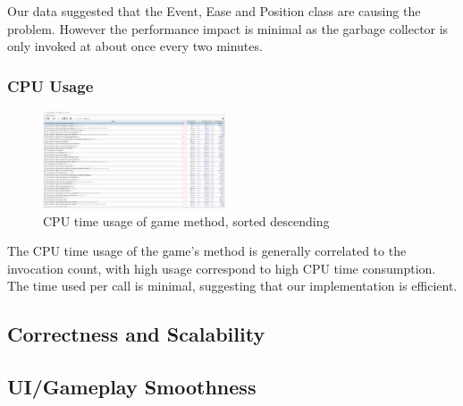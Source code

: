 \documentclass[conference]{IEEEtran}
\begin{document}
Our data suggested that the Event, Ease and Position class are causing the problem.
However the performance impact is minimal as the garbage collector is only invoked at about once every two minutes.

\subsubsection{CPU Usage}

\begin{figure}[htbp]
    \centerline{\includegraphics[width=0.48\textwidth]{assets/cpu-time-tree.png}}
    \caption{CPU time usage of game method, sorted descending}\label{fig:cpu-time-tree}
\end{figure}

The CPU time usage of the game's method is generally correlated to the invocation count, with high usage correspond to high CPU time consumption.
The time used per call is minimal, suggesting that our implementation is efficient.

\subsection{Correctness and Scalability}

\subsection{UI/Gameplay Smoothness}

\end{document}
